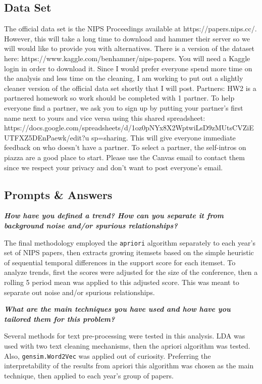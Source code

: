 \documentclass[11pt]{article}
\begin{document}
\subsection{Data Set}\label{data-set}

The official data set is the NIPS Proceedings available at
https://papers.nips.cc/. However, this will take a long time to download
and hammer their server so we will would like to provide you with
alternatives. There is a version of the dataset here:
https://www.kaggle.com/benhamner/nips-papers. You will need a Kaggle
login in order to download it. Since I would prefer everyone spend more
time on the analysis and less time on the cleaning, I am working to put
out a slightly cleaner version of the official data set shortly that I
will post. Partners: HW2 is a partnered homework so work should be
completed with 1 partner. To help everyone find a partner, we ask you to
sign up by putting your partner's first name next to yours and vice
versa using this shared spreadsheet:
https://docs.google.com/spreadsheets/d/1oz0pNYx8X2WptwiLsD9zMUtsCVZiEUTFXZ5DEnPaewk/edit?u
sp=sharing. This will give everyone immediate feedback on who doesn't
have a partner. To select a partner, the self-intros on piazza are a
good place to start. Please use the Canvas email to contact them since
we respect your privacy and don't want to post everyone's email.

\subsection{Prompts \& Answers}\label{prompts-answers}

\textbf{\emph{How have you defined a trend? How can you separate it from
background noise and/or spurious relationships?}}

The final methodology employed the \texttt{apriori} algorithm separately
to each year's set of NIPS papers, then extracts growing itemsets based
on the simple heuristic of sequential temporal differences in the
support score for each itemset. To analyze trends, first the scores were
adjusted for the size of the conference, then a rolling 5 period mean
was applied to this adjusted score. This was meant to separate out noise
and/or spurious relationships.

\textbf{\emph{What are the main techniques you have used and how have
you tailored them for this problem?}}

Several methods for text pre-processing were tested in this analysis.
LDA was used with two text cleaning mechanisms, then the apriori
algorithm was tested. Also, \texttt{gensim.Word2Vec} was applied out of
curiosity. Preferring the interpretability of the results from apriori
this algorithm was chosen as the main technique, then applied to each
year's group of papers.
\end{document}
